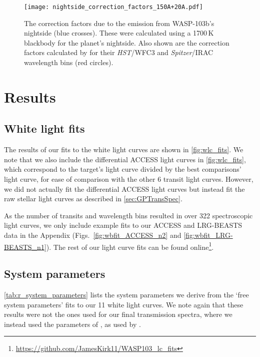 \documentclass[twocolumn]{aastex63}
\begin{document}
\begin{figure}
    \centering
    \texttt{[image: nightside\_correction\_factors\_150A+20A.pdf]}
    \caption{The correction factors due to the emission from WASP-103b's nightside (blue crosses). These were calculated using a 1700\,K blackbody for the planet's nightside. Also shown are the correction factors calculated by \protect\cite{Kreidberg2018} for their \textit{HST}/WFC3 and \textit{Spitzer}/IRAC wavelength bins (red circles).}
    \label{fig:nightside_corr}
\end{figure}




\section{Results}
\label{sec:results}

\subsection{White light fits}

The results of our fits to the white light curves are shown in \autoref{fig:wlc_fits}. We note that we also include the differential ACCESS light curves in \autoref{fig:wlc_fits}, which correspond to the target's light curve divided by the best comparisons' light curve, for ease of comparison with the other 6 transit light curves. However, we did not actually fit the differential ACCESS light curves but instead fit the raw stellar light curves as described in \autoref{sec:GPTransSpec}.

As the number of transits and wavelength bins resulted in over 322 spectroscopic light curves, we only include example fits to our ACCESS and LRG-BEASTS data in the Appendix (Figs.\ \ref{fig:wbfit_ACCESS_n2} and \ref{fig:wbfit_LRG-BEASTS_n1}). The rest of our light curve fits can be found online\footnote{\url{https://github.com/JamesKirk11/WASP103_lc_fits}}. 

\subsection{System parameters}
\label{sec:system_params}

\autoref{tab:r_system_parameters} lists the system parameters we derive from the `free system parameters' fits to our 11 white light curves. We note again that these results were not the ones used for our final transmission spectra, where we instead used the parameters of \cite{Southworth2015}, as used by \cite{Kreidberg2018}. 
\end{document}

